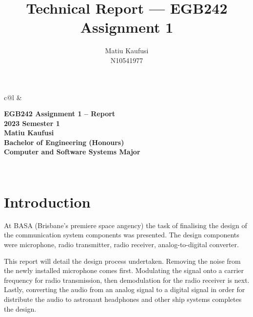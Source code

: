 \documentclass{article}
\title{ Technical Report --- EGB242 Assignment 1}
\author{Matiu Kaufusi\\N10541977}
\begin{document}
\begin{titlepage}
    \begin{center}
        \begin{tabular}{c@{\hskip 5cm}l}
             &  %
        \end{tabular}
    \end{center}

    \centering
    \vfill
    {\bfseries\Large
        EGB242 Assignment 1 -- Report\\
        2023 Semester 1\\
        \vskip2cm
        Matiu Kaufusi\\
        \vskip1cm
        Bachelor of Engineering (Honours)\\
        Computer and Software Systems Major\\
    }
    \vfill

    \vfill
    \vfill
\end{titlepage}

\newpage
\tableofcontents
\newpage
‌\section{Introduction}
At BASA (Brisbane's premiere space angency) the task of finalising the design of the communication system components was presented. The design components were microphone, radio transmitter, radio receiver, analog-to-digital converter.
\par
This report will detail the design process undertaken. Removing the noise from the newly installed microphone comes first. Modulating the signal onto a carrier frequency for radio transmission, then demodulation for the radio receiver is next. Lastly, converting the audio from an analog signal to a digital signal in order for distribute the audio to astronaut headphones and other ship systems completes the design.
\end{document}
